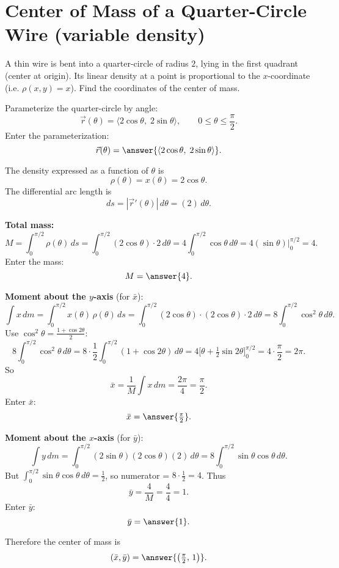 \documentclass{ximera}
\begin{document}
\section{Center of Mass of a Quarter-Circle Wire (variable density)}

\begin{problem}
A thin wire is bent into a quarter-circle of radius $2$, lying in the first quadrant (center at origin). Its linear density at a point is proportional to the $x$-coordinate (i.e. $\rho(x,y)=x$). Find the coordinates of the center of mass.
\end{problem}

\begin{solution}
Parameterize the quarter-circle by angle:
\[
\vec r(\theta)=\langle 2\cos\theta,\;2\sin\theta\rangle,\qquad 0\le\theta\le\frac{\pi}{2}.
\]
Enter the parameterization:
\[
\vec r(\theta)=\answer{\langle 2\cos\theta,\;2\sin\theta\rangle}.
\]

The density expressed as a function of $\theta$ is
\[
\rho(\theta)=x(\theta)=2\cos\theta.
\]
The differential arc length is
\[
ds=|\vec r'(\theta)|\,d\theta = (2)\,d\theta.
\]

\textbf{Total mass:}
\[
M=\int_0^{\pi/2} \rho(\theta)\,ds
=\int_0^{\pi/2} (2\cos\theta)\cdot 2\,d\theta
=4\int_0^{\pi/2}\cos\theta\,d\theta
=4(\sin\theta)\Big|_0^{\pi/2}=4.
\]
Enter the mass:
\[
M=\answer{4}.
\]

\textbf{Moment about the $y$-axis} (for $\bar x$):
\[
\int x\,dm = \int_0^{\pi/2} x(\theta)\,\rho(\theta)\,ds
= \int_0^{\pi/2} (2\cos\theta)\cdot(2\cos\theta)\cdot 2\,d\theta
=8\int_0^{\pi/2}\cos^2\theta\,d\theta.
\]
Use $\cos^2\theta=\frac{1+\cos 2\theta}{2}$:
\[
8\int_0^{\pi/2}\cos^2\theta\,d\theta
=8\cdot\frac{1}{2}\int_0^{\pi/2}(1+\cos 2\theta)\,d\theta
=4\Big[\theta+\tfrac{1}{2}\sin 2\theta\Big]_0^{\pi/2}
=4\cdot\frac{\pi}{2}=2\pi.
\]
So
\[
\bar x=\frac{1}{M}\int x\,dm=\frac{2\pi}{4}=\frac{\pi}{2}.
\]
Enter $\bar x$:
\[
\bar x=\answer{\tfrac{\pi}{2}}.
\]

\textbf{Moment about the $x$-axis} (for $\bar y$):
\[
\int y\,dm = \int_0^{\pi/2} (2\sin\theta)(2\cos\theta)(2)\,d\theta
=8\int_0^{\pi/2}\sin\theta\cos\theta\,d\theta.
\]
But $\int_0^{\pi/2}\sin\theta\cos\theta\,d\theta = \tfrac12$, so numerator = $8\cdot\tfrac12=4$.
Thus
\[
\bar y=\frac{4}{M}=\frac{4}{4}=1.
\]
Enter $\bar y$:
\[
\bar y=\answer{1}.
\]

Therefore the center of mass is
\[
(\bar x,\bar y)=\answer{\left(\tfrac{\pi}{2},\,1\right)}.
\]

\bigskip
\begin{multipleChoice}
\end{multipleChoice}
\end{solution}
\end{document}
